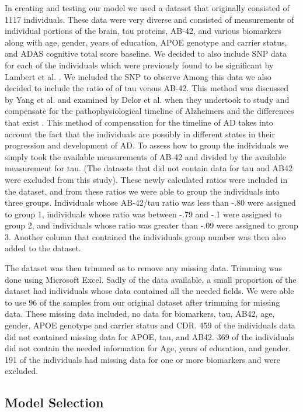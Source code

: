 \documentclass[10pt]{article}
\begin{document}
In creating and testing our model we used a dataset that originally consisted of 1117 individuals. These data were very diverse and consisted of measurements of individual portions of the brain, tau proteins, AB-42, and various biomarkers along with age, gender, years of education, APOE genotype and carrier status, and ADAS cognitive total score baseline. We decided to also include SNP data for each of the individuals which were previously found to be significant by Lambert et al. \cite{lambert2013meta} . We included the SNP to observe  Among this data we also decided to include the ratio of of tau versus AB-42. This method was discussed by Yang et al. and examined by Delor et al. when they undertook to study and compensate for the pathophysiological timeline of Alzheimers and the differences that exist \cite{Yang2011, delor2013}. This method of compensation for the timeline of AD takes into account the fact that the individuals are possibly in different states in their progression and development of AD. To assess how to group the individuals we simply took the available measurements of AB-42 and divided by the available measurement for tau. (The datasets that did not contain data for tau and AB42 were excluded from this study). These newly calculated ratios were included in the dataset, and from these ratios we were able to group the individuals into three groups. Individuals whose AB-42/tau ratio was less than -.80 were assigned to group 1, individuals whose ratio was between -.79 and -.1 were assigned to group 2, and individuals whose ratio was greater than -.09 were assigned to group 3. Another column that contained the individuals group number was then also added to the dataset. 

The dataset was then trimmed as to remove any missing data. Trimming was done using Microsoft Excel. Sadly of the data available, a small proportion of the dataset had individuals whose data contained all the needed fields. We were able to use 96 of the samples from our original dataset after trimming for missing data. These missing data included, no data for biomarkers, tau, AB42, age, gender, APOE genotype and carrier status and CDR. 459 of the individuals data did not contained missing data for APOE, tau, and AB42. 369 of the individuals did not contain the needed information for Age, years of education, and gender. 191 of the individuals had missing data for one or more biomarkers and were excluded.


\subsection*{Model Selection}
\end{document}
